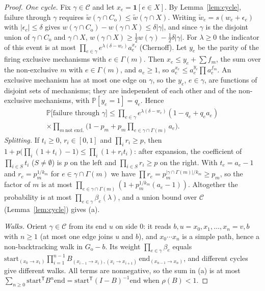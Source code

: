 \documentclass[11pt]{article}
\theoremstyle{plain}
\theoremstyle{definition}
\theoremstyle{remark}
\newcommand{\Prob}{\mathbb{P}}
\newcommand{\Go}{G_{\mathrm{o}}}
\newcommand{\Co}{C_{\mathrm{o}}}
\newcommand{\cC}{\mathcal{C}}
\newcommand{\tw}{\tilde w}
\newcommand{\one}{\mathbf 1}
\renewcommand{\_}{\oldunderscore\allowbreak}
\begin{document}
\begin{proof}
\emph{One cycle.} Fix $\gamma\in\cC$ and let $x_e=\one[e\in X]$. By Lemma~\ref{lem:cycle}, failure through $\gamma$ requires $\tw(\gamma\cap\Co)\le\tw(\gamma\cap X)$. Writing $\tw_e=s(w_e+\epsilon_e)$ with $|\epsilon_e|\le\delta$ gives $w(\gamma\cap\Co)-w(\gamma\cap X)\le\delta|\gamma|$, and since $\gamma$ is the disjoint union of $\gamma\cap\Co$ and $\gamma\cap X$, $w(\gamma\cap X)\ge\tfrac12w(\gamma)-\tfrac12\delta|\gamma|$. For $\lambda\ge0$ the indicator of this event is at most $\prod_{e\in\gamma}e^{\lambda(\delta-w_e)}a_e^{x_e}$ (Chernoff).
Let $y_e$ be the parity of the firing exclusive mechanisms with $e\in\Gamma(m)$. Then $x_e\le y_e+\sum f_m$, the sum over the non-exclusive $m$ with $e\in\Gamma(m)$, and $a_e\ge1$, so $a_e^{x_e}\le a_e^{y_e}\prod a_e^{f_m}$. An exclusive mechanism has at most one edge on $\gamma$, so the $y_e$, $e\in\gamma$, are functions of disjoint sets of mechanisms; they are independent of each other and of the non-exclusive mechanisms, with $\Prob[y_e=1]=q_e$. Hence
\[
\begin{multlined}
\Prob\big[\text{failure through }\gamma\big]\le\prod_{e\in\gamma}e^{\lambda(\delta-w_e)}(1-q_e+q_ea_e)\\
\times\prod_{m\ \text{not excl.}}\Big(1-p_m+p_m\prod_{e\in\gamma\cap\Gamma(m)}a_e\Big).
\end{multlined}
\]
\emph{Splitting.} If $t_i\ge0$, $r_i\in[0,1]$ and $\prod_ir_i\ge p$, then $1+p\big(\prod_i(1+t_i)-1\big)\le\prod_i(1+r_it_i)$: after expansion, the coefficient of $\prod_{i\in S}t_i$ ($S\ne\emptyset$) is $p$ on the left and $\prod_{i\in S}r_i\ge p$ on the right. With $t_e=a_e-1$ and $r_e=p_m^{1/k_m}$ for $e\in\gamma\cap\Gamma(m)$ we have $\prod r_e=p_m^{|\gamma\cap\Gamma(m)|/k_m}\ge p_m$, so the factor of $m$ is at most $\prod_{e\in\gamma\cap\Gamma(m)}(1+p_m^{1/k_m}(a_e-1))$. Altogether the probability is at most $\prod_{e\in\gamma}\beta_e(\lambda)$, and a union bound over $\cC$ (Lemma~\ref{lem:cycle}) gives (a).

\emph{Walks.} Orient $\gamma\in\cC$ from its end $u$ on side $0$: it reads $b,u=x_0,x_1,\dots,x_n=v,b$ with $n\ge1$ (at most one edge joins $u$ and $b$), and $x_0\cdots x_n$ is a simple path, hence a non-backtracking walk in $\Go-b$. Its weight $\prod_{e\in\gamma}\beta_e$ equals $\mathrm{start}_{(x_0\to x_1)}\prod_{i=1}^{n-1}B_{(x_{i-1}\to x_i),(x_i\to x_{i+1})}\,\mathrm{end}_{(x_{n-1}\to x_n)}$, and different cycles give different walks. All terms are nonnegative, so the sum in (a) is at most $\sum_{n\ge0}\mathrm{start}^{\mathsf T}B^n\mathrm{end}=\mathrm{start}^{\mathsf T}(I-B)^{-1}\mathrm{end}$ when $\rho(B)<1$.


\end{proof}
\end{document}
